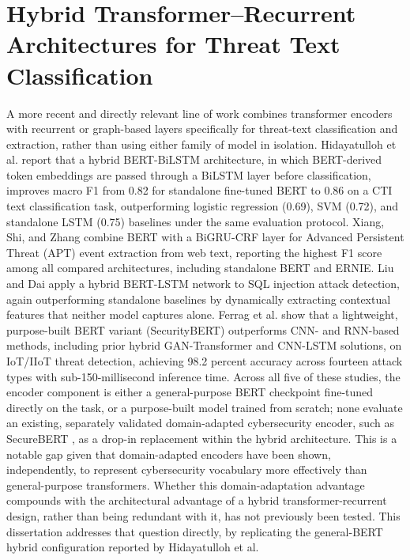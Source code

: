 \documentclass[12pt,a4paper]{report}
\begin{document}
\section{Hybrid Transformer--Recurrent Architectures for Threat Text Classification}

A more recent and directly relevant line of work combines transformer
encoders with recurrent or graph-based layers specifically for
threat-text classification and extraction, rather than using either
family of model in isolation. Hidayatulloh et al.
\cite{hidayatulloh2026hybrid}
report that a hybrid BERT-BiLSTM architecture, in which BERT-derived
token embeddings are passed through a BiLSTM layer before
classification, improves macro F1 from 0.82 for standalone fine-tuned
BERT to 0.86 on a CTI text classification task, outperforming logistic
regression (0.69), SVM (0.72), and standalone LSTM (0.75) baselines
under the same evaluation protocol. Xiang, Shi, and Zhang
\cite{xiang2023apt}
combine BERT with a BiGRU-CRF layer for Advanced Persistent Threat (APT)
event extraction from web text, reporting the highest F1 score among all
compared architectures, including standalone BERT and ERNIE. Liu and Dai
\cite{liu2024sql}
apply a hybrid BERT-LSTM network to SQL injection attack detection,
again outperforming standalone baselines by dynamically extracting
contextual features that neither model captures alone. Ferrag et al.
\cite{ferrag2024llm}
show that a lightweight, purpose-built BERT variant (SecurityBERT)
outperforms CNN- and RNN-based methods, including prior hybrid
GAN-Transformer and CNN-LSTM solutions, on IoT/IIoT threat detection,
achieving 98.2 percent accuracy across fourteen attack types with
sub-150-millisecond inference time. Across all five of these studies,
the encoder component is either a general-purpose BERT checkpoint
fine-tuned directly on the task, or a purpose-built model trained from
scratch; none evaluate an existing, separately validated domain-adapted
cybersecurity encoder, such as SecureBERT
\cite{securebert2022},
as a drop-in replacement within the hybrid architecture. This is a
notable gap given that domain-adapted encoders have been shown,
independently, to represent cybersecurity vocabulary more effectively
than general-purpose transformers. Whether this domain-adaptation
advantage compounds with the architectural advantage of a hybrid
transformer-recurrent design, rather than being redundant with it, has
not previously been tested. This dissertation addresses that question
directly, by replicating the general-BERT hybrid configuration reported
by Hidayatulloh et al.
\end{document}

